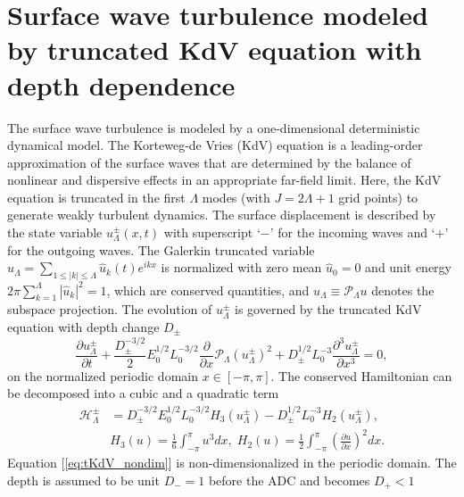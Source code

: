 \documentclass[9pt,twocolumn,twoside,lineno]{pnas-new}
\begin{document}
\section{Surface wave turbulence modeled by truncated KdV equation with depth dependence\label{sec:Surface-wave-turbulence}}

The surface wave turbulence is modeled by a one-dimensional deterministic
dynamical model. 
The Korteweg-de Vries (KdV) equation \cite{johnson1997modern}
is a leading-order approximation of the surface waves that are determined
by the balance of nonlinear and dispersive effects in an appropriate
far-field limit. Here, the KdV equation is truncated in the first
$\Lambda$ modes (with $J=2\Lambda+1$ grid points) to generate weakly
turbulent dynamics. The surface displacement is described by
the state variable $u_{\Lambda}^{\pm}\left(x,t\right)$ with superscript `$-$'
for the incoming waves and `$+$' for the outgoing waves. The Galerkin
truncated variable $u_{\Lambda}=\sum_{1\leq\left|k\right|\leq\Lambda}\hat{u}_{k}\left(t\right)e^{ikx}$
is normalized with zero mean $\hat{u}_{0}=0$ and unit energy $2\pi\sum_{k=1}^{\Lambda}\left|\hat{u}_{k}\right|^{2}=1$,
which are conserved quantities, and $u_{\Lambda}\equiv\mathcal{P}_{\Lambda}u$
denotes the subspace projection. The evolution of  $u_{\Lambda}^{\pm}$ is governed by the truncated
KdV equation with depth change $D_{\pm}$
\begin{equation}
\frac{\partial u_{\Lambda}^{\pm}}{\partial t}+\frac{D_{\pm}^{-3/2}}{2}E_{0}^{1/2}L_{0}^{-3/2}\frac{\partial}{\partial x}\mathcal{P}_{\Lambda}\left(u_{\Lambda}^{\pm}\right)^{2}+D_{\pm}^{1/2}L_{0}^{-3}\frac{\partial^{3}u_{\Lambda}^{\pm}}{\partial x^{3}}=0,\label{eq:tKdV_nondim}
\end{equation}
on the normalized periodic domain $x\in\left[-\pi,\pi\right]$. The conserved Hamiltonian can be decomposed into a cubic and a quadratic term
\begin{align*}
\mathcal{H}_{\Lambda}^{\pm} & =  D_{\pm}^{-3/2}E_{0}^{1/2}L_{0}^{-3/2}H_{3}\left(u_{\Lambda}^{\pm}\right)-D_{\pm}^{1/2}L_{0}^{-3}H_{2}\left(u_{\Lambda}^{\pm}\right),\\
& H_{3}\left(u\right) =  \frac{1}{6}\int_{-\pi}^{\pi}u^{3}dx,\;H_{2}\left(u\right)=\frac{1}{2}\int_{-\pi}^{\pi}\left(\frac{\partial u}{\partial x}\right)^{2}dx.
\end{align*}
Equation [\ref{eq:tKdV_nondim}] is non-dimensionalized in the periodic
domain. The depth is assumed to be unit $D_{-}=1$
before the ADC and becomes $D_{+}<1$
\end{document}
